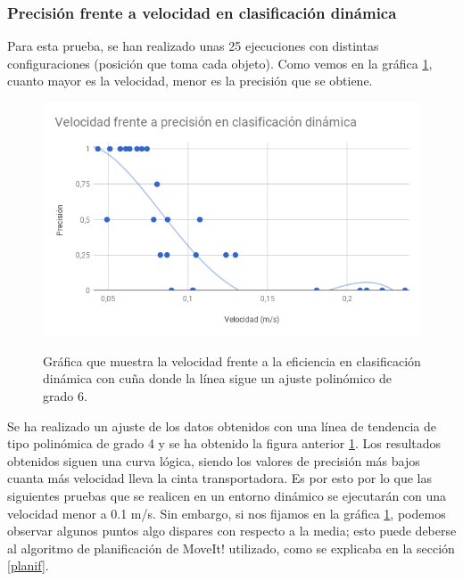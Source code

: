 \subsubsection{Precisión frente a velocidad en clasificación dinámica}
\noindent Para esta prueba, se han realizado unas 25 ejecuciones con distintas configuraciones (posición que toma cada objeto). Como vemos en la gráfica \ref{cd:ve}, cuanto mayor es la velocidad, menor es la precisión que se obtiene.\\

\begin{figure}[H]
	\centering %
	\label{cd:ve}
	\includegraphics[scale=0.55]{imagenes/vel-eficiencia.png}
	\caption{Gráfica que muestra la velocidad frente a la eficiencia en clasificación dinámica con cuña donde la línea sigue un ajuste polinómico de grado 6.}
\end{figure}


\noindent Se ha realizado un ajuste de los datos obtenidos con una línea de tendencia de tipo polinómica de grado 4 y se ha obtenido la figura anterior \ref{cd:ve}. Los resultados obtenidos siguen una curva lógica, siendo los valores de precisión más bajos cuanta más velocidad lleva la cinta transportadora. Es por esto por lo que las siguientes pruebas que se realicen en un entorno dinámico se ejecutarán con una velocidad menor a 0.1 m/s. Sin embargo, si nos fijamos en la gráfica \ref{cd:ve}, podemos observar algunos puntos algo dispares con respecto a la media; esto puede deberse al algoritmo de planificación de MoveIt! utilizado, como se explicaba en la sección \ref{planif}. \\

